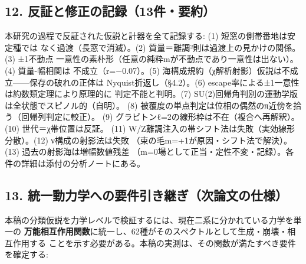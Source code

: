 \documentclass[
]{ltjsarticle}
\begin{document}
\subsection{12.
反証と修正の記録（13件・要約）}\label{ux53cdux8a3cux3068ux4feeux6b63ux306eux8a18ux933213ux4ef6ux8981ux7d04}

本研究の過程で反証された仮説と計器を全て記録する: (1)
短窓の側帯番地は安定種では なく過渡（長窓で消滅）。(2)
質量＝離調²則は過渡上の見かけの関係。(3) ±1不動点
一意性の素朴形（任意の純粋mが不動点であり一意性は出ない）。(4)
質量-幅相関は 不成立（r=−0.07）。(5)
海構成規約（χ解析射影）仮説は不成立------保存の破れの正体は
Nyquist折返し（§4.2）。(6)
escape率による±1一意性は約数類定理により原理的に 判定不能と判明。(7)
SU(2)回帰角判別の運動学版は全状態でスピノル的（自明）。 (8)
被覆度の単点判定は位相の偶然のπ近傍を拾う（回帰列判定に較正）。 (9)
グラビトンℓ=2の線形枠は不在（複合へ再解釈）。(10) 世代＝χ帯位置は反証。
(11) W/Z離調注入の帯シフト法は失敗（実効線形分散）。(12)
ν構成の射影法は失敗 （束の毛m=+1が原因・シフト法で解決）。(13)
過去の射影海は増幅数値残差
（m=0場として正当・定性不変・記録）。各件の詳細は添付の分析ノートにある。

\subsection{13.
統一動力学への要件引き継ぎ（次論文の仕様）}\label{ux7d71ux4e00ux52d5ux529bux5b66ux3078ux306eux8981ux4ef6ux5f15ux304dux7d99ux304eux6b21ux8ad6ux6587ux306eux4ed5ux69d8}

本稿の分類仮説を力学レベルで検証するには、現在二系に分かれている力学を単一の
\textbf{万能相互作用関数}に統一し、62種がそのスペクトルとして生成・崩壊・相互作用する
ことを示す必要がある。本稿の実測は、その関数が満たすべき要件を確定する:
\end{document}

